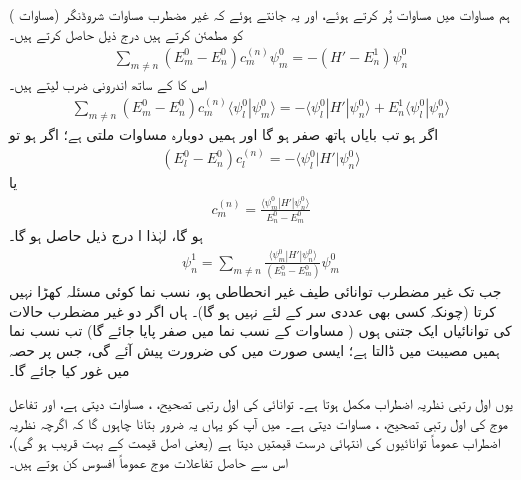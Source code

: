  ہم مساوات  میں مساوات  پُر کرتے ہوئے، اور یہ جانتے ہوئے کہ غیر مضطرب مساوات شروڈنگر (مساوات ) کو  مطمئن کرتے ہیں درج ذیل حاصل کرتے ہیں۔
\begin{align*}
\sum_{m \ne n} {(E_m^0 - E_n^0) c_m^{(n)} \psi_m^0} = - {(H' - E_n^1) \psi_n^0}
\end{align*}
اس کا  کے ساتھ اندرونی ضرب لیتے ہیں۔
\begin{align*}
\sum_{m \ne n} (E_m^0 - E_n^0) c_m^{(n)} \langle \psi_l^0 | \psi_m^0 \rangle = - \langle \psi_l^0 | H' | \psi_n^0 \rangle + E_n^1 \langle \psi_l^0 | \psi_n^0 \rangle 
\end{align*}
اگر  ہو تب بایاں ہاتھ صفر ہو گا اور ہمیں دوبارہ مساوات  ملتی ہے؛ اگر  ہو تو 
\begin{align*}
(E_l^0 - E_n^0) c_l^{(n)} = - \langle \psi_l^0 | H' | \psi_n^0 \rangle
\end{align*}
یا 
\begin{align}\label{مساوات_غیر_اضطراب_عددی_سر_ایم}
c_m^{(n)} = \frac{\langle \psi_m^0 | H' | \psi_n^0 \rangle}{E_n^0 - E_m^0}
\end{align}
ہو گا، لہٰذا ا درج ذیل حاصل ہو گا۔
\begin{align}\label{مساوات_غیر_اضطراب_تفاعل_این}
\psi_n^1 = \sum_{m \ne n} \frac{\langle \psi_m^0 | H' | \psi_n^0 \rangle}{(E_n^0 - E_m^0)} \psi_m^0
\end{align}
جب تک غیر مضطرب توانائی طیف غیر انحطاطی ہو، نسب نما کوئی مسئلہ کھڑا نہیں کرتا (چونکہ کسی بھی عددی سر کے لئے  نہیں ہو گا)۔ ہاں اگر دو غیر مضطرب حالات کی توانائیاں ایک جتنی ہوں ( مساوات  کے نسب نما میں صفر پایا جائے گا) تب نسب نما ہمیں مصیبت میں ڈالتا ہے؛ ایسی صورت میں  کی ضرورت پیش آئے گی، جس پر حصہ  میں غور کیا جائے گا۔ 

 یوں اول رتبی نظریہ اضطراب مکمل ہوتا ہے۔ توانائی کی اول رتبی تصحیح، ، مساوات  دیتی ہے، اور تفاعل موج کی اول رتبی تصحیح، ، مساوات  دیتی ہے۔ میں آپ کو یہاں یہ ضرور بتانا چاہوں گا کہ اگرچہ نظریہ اضطراب عموماً توانائیوں کی انتہائی درست قیمتیں دیتا ہے (یعنی  اصل قیمت  کے بہت قریب ہو گی)، اس سے حاصل تفاعلات موج عموماً افسوس کن ہوتے ہیں۔ 

